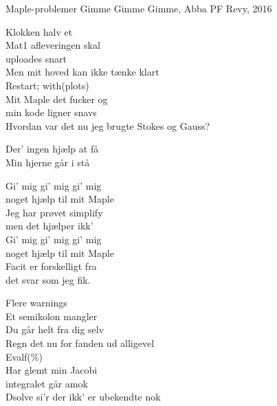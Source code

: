 \begin{song}{Maple-problemer}
  {} %
  {Gimme Gimme Gimme, Abba} %
  {} %
  {PF Revy, 2016} %
  {\NotCCLIed} %

  \begin{SBVerse}
    Klokken halv et\\
    Mat1 afleveringen skal\\
    uploades snart\\
    Men mit hoved kan ikke tænke klart\\
    \medskip
    Restart; with(plots)\\
    Mit Maple det fucker og\\
    min kode ligner snavs\\
    Hvordan var det nu jeg brugte Stokes og Gauss?
  \end{SBVerse}

  \begin{SBSection*}
    Der' ingen hjælp at få\\
    Min hjerne går i stå
  \end{SBSection*}

  \begin{SBChorus}
    Gi' mig gi' mig gi' mig\\
    noget hjælp til mit Maple\\
    Jeg har prøvet simplify\\
    men det hjælper ikk'\\
    Gi' mig gi' mig gi' mig\\
    noget hjælp til mit Maple\\
    Facit er forskelligt fra\\
    det svar som jeg fik.
  \end{SBChorus}

  \begin{SBVerse}
    Flere warnings\\
    Et semikolon mangler\\
    Du går helt fra dig selv\\
    Regn det nu for fanden ud alligevel\\
    \medskip
    Evalf(\%)\\
    Har glemt min Jacobi\\
    integralet går amok\\
    Dsolve si'r der ikk' er ubekendte nok
  \end{SBVerse}


\end{song}
